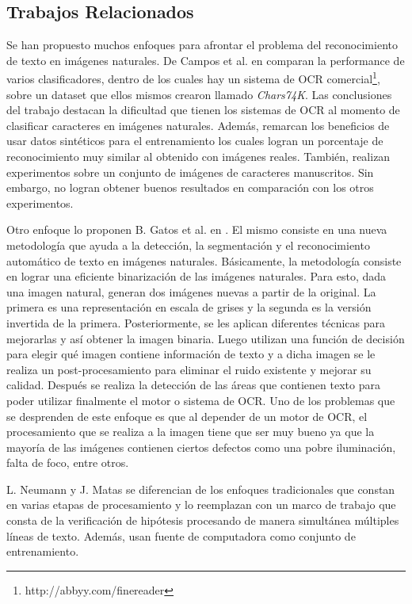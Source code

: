 \subsection{Trabajos Relacionados}
	
	Se han propuesto muchos enfoques para afrontar el problema del reconocimiento de texto en imágenes naturales. De Campos et al. en \cite{dCBV09} comparan la performance de varios clasificadores, dentro de los cuales hay un sistema de OCR comercial\footnote{http://abbyy.com/finereader}, sobre un dataset que ellos mismos crearon llamado \textit{Chars74K}. Las conclusiones del trabajo destacan la dificultad que tienen los sistemas de OCR al momento de clasificar caracteres en imágenes naturales. Además, remarcan los beneficios de usar datos sintéticos para el entrenamiento los cuales logran un porcentaje de reconocimiento muy si\-mi\-lar al obtenido con imágenes reales. También, realizan experimentos sobre un conjunto de imágenes de caracteres manuscritos. Sin embargo, no logran obtener buenos resultados en comparación con los otros experimentos. 
	
	Otro enfoque lo proponen B. Gatos et al. en \cite{GPP03}. El mismo consiste en una nueva metodología que ayuda a la detección, la segmentación y el reconocimiento automático de texto en imágenes naturales. Básicamente, la metodología consiste en lograr una eficiente binarización de las imágenes naturales. Para esto, dada una imagen natural, generan dos imágenes nuevas a partir de la original. La primera es una representación en escala de grises y la segunda es la versión invertida de la primera. Posteriormente, se les aplican diferentes técnicas para mejorarlas y así obtener la imagen binaria. Luego utilizan una función de decisión para elegir qué imagen contiene información de texto y a dicha imagen se le realiza un post-procesamiento para eliminar el ruido existente y mejorar su calidad. Después se realiza la detección de las áreas que contienen texto para poder utilizar finalmente el motor o sistema de OCR. Uno de los problemas que se desprenden de este enfoque es que al depender de un motor de OCR, el procesamiento que se realiza a la imagen tiene que ser muy bueno ya que la mayoría de las imágenes contienen ciertos defectos como una pobre iluminación, falta de foco, entre otros.

	L. Neumann y J. Matas \cite{LNJM} se diferencian de los enfoques tradicionales que constan en varias etapas de procesamiento y lo reemplazan con un marco de trabajo que consta de la verificación de hipótesis procesando de manera simultánea múltiples líneas de texto. Además, usan fuente de computadora como conjunto de entrenamiento.
	